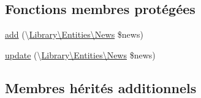 \subsection*{Fonctions membres protégées}
\begin{DoxyCompactItemize}
\item 
\hyperlink{class_library_1_1_models_1_1_news_manager___p_d_o_a79bc3925eb60247d6d2c257530a456cd}{add} (\textbackslash{}\hyperlink{class_library_1_1_entities_1_1_news}{Library\textbackslash{}\+Entities\textbackslash{}\+News} \$news)
\item 
\hyperlink{class_library_1_1_models_1_1_news_manager___p_d_o_a13c8853d35aa529262e781338d8ac3f6}{update} (\textbackslash{}\hyperlink{class_library_1_1_entities_1_1_news}{Library\textbackslash{}\+Entities\textbackslash{}\+News} \$news)
\end{DoxyCompactItemize}
\subsection*{Membres hérités additionnels}


